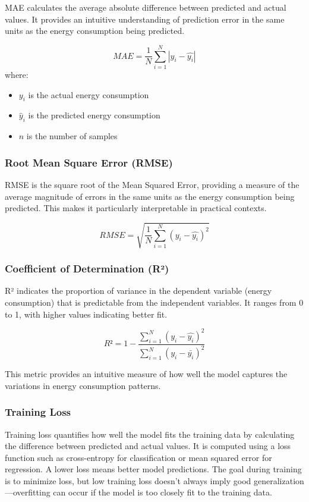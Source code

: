 MAE calculates the average absolute difference between predicted and actual values. It provides an intuitive understanding of prediction error in the same units as the energy consumption being predicted.

\[
    MAE = \frac{1}{N}\sum_{i=1}^{N}|y_i - \hat{y_i}|
\]
where:

\begin{itemize}
    \item $y_i$ is the actual energy consumption
    \item $\hat{y}_i$ is the predicted energy consumption
    \item $n$ is the number of samples
\end{itemize}

\subsubsection{Root Mean Square Error (RMSE)}

RMSE is the square root of the Mean Squared Error, providing a measure of the average magnitude of errors in the same units as the energy consumption being predicted. This makes it particularly interpretable in practical contexts.

\[
    RMSE = \sqrt{\frac{1}{N}\sum_{i=1}^{N}( y_i - \hat{y_i})^2}
\]

\subsubsection{Coefficient of Determination (R²)}

R² indicates the proportion of variance in the dependent variable (energy consumption) that is predictable from the independent variables. It ranges from 0 to 1, with higher values indicating better fit.

\[
    R² =  1 -\frac{\sum_{i=1}^{N}( y_i - \hat{y_i})^2}{\sum_{i=1}^{N}( y_i - \bar{y_i})^2}
\]

This metric provides an intuitive measure of how well the model captures the variations in energy consumption patterns.


\subsubsection{Training Loss}
Training loss quantifies how well the model fits the training data by calculating the difference between predicted and actual values. It is computed using a loss function such as cross-entropy for classification or mean squared error for regression. A lower loss means better model predictions. The goal during training is to minimize loss, but low training loss doesn’t always imply good generalization—overfitting can occur if the model is too closely fit to the training data.

